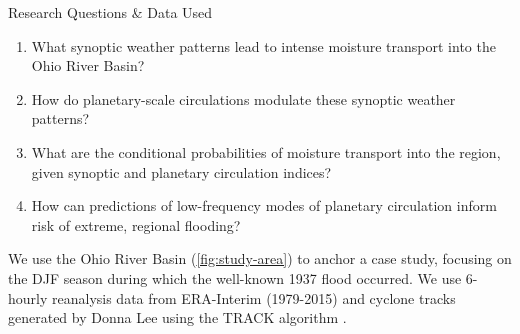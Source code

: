 \begin{block}{Research Questions \& Data Used}
    \begin{enumerate}
        \item What synoptic weather patterns lead to intense moisture transport into the Ohio River Basin?
        \item How do planetary-scale circulations modulate these synoptic weather patterns?
        \item What are the conditional probabilities of moisture transport into the region, given synoptic and planetary circulation indices?
        \item How can predictions of low-frequency modes of planetary circulation inform risk of extreme, regional flooding?
    \end{enumerate}
    We use the Ohio River Basin (\cref{fig:study-area}) to anchor a case study, focusing on the DJF season during which the well-known 1937 flood occurred.
    We use 6-hourly reanalysis data from ERA-Interim \cite{Dee2011} (1979-2015) and cyclone tracks generated by Donna Lee \cite{Booth2015} using the TRACK algorithm \cite{Hodges1994}.
\end{block}
